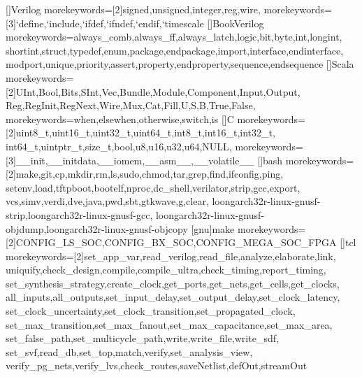 []{Verilog}{
  morekeywords=[2]{signed,unsigned,integer,reg,wire},
  morekeywords=[3]{`define,`include,`ifdef,`ifndef,`endif,`timescale}
}
[]{BookVerilog}{
  morekeywords={always_comb,always_ff,always_latch,logic,bit,byte,int,longint,
    shortint,struct,typedef,enum,package,endpackage,import,interface,endinterface,
    modport,unique,priority,assert,property,endproperty,sequence,endsequence}
}
[]{Scala}{
  morekeywords=[2]{UInt,Bool,Bits,SInt,Vec,Bundle,Module,Component,Input,Output,
    Reg,RegInit,RegNext,Wire,Mux,Cat,Fill,U,S,B,True,False},
  morekeywords={when,elsewhen,otherwise,switch,is}
}
[]{C}{
  morekeywords=[2]{uint8_t,uint16_t,uint32_t,uint64_t,int8_t,int16_t,int32_t,
    int64_t,uintptr_t,size_t,bool,u8,u16,u32,u64,NULL},
  morekeywords=[3]{__init,__initdata,__iomem,__asm__,__volatile__}
}
[]{bash}{
  morekeywords=[2]{make,git,cp,mkdir,rm,ls,sudo,chmod,tar,grep,find,ifconfig,ping,
    setenv,load,tftpboot,bootelf,nproc,dc_shell,verilator,strip,gcc,export,
    vcs,simv,verdi,dve,java,pwd,sbt,gtkwave,g,clear,
    loongarch32r-linux-gnusf-strip,loongarch32r-linux-gnusf-gcc,
    loongarch32r-linux-gnusf-objdump,loongarch32r-linux-gnusf-objcopy}
}
[gnu]{make}{
  morekeywords=[2]{CONFIG_LS_SOC,CONFIG_BX_SOC,CONFIG_MEGA_SOC_FPGA}
}
[]{tcl}{
  morekeywords=[2]{set_app_var,read_verilog,read_file,analyze,elaborate,link,
    uniquify,check_design,compile,compile_ultra,check_timing,report_timing,
    set_synthesis_strategy,create_clock,get_ports,get_nets,get_cells,get_clocks,
    all_inputs,all_outputs,set_input_delay,set_output_delay,set_clock_latency,
    set_clock_uncertainty,set_clock_transition,set_propagated_clock,
    set_max_transition,set_max_fanout,set_max_capacitance,set_max_area,
    set_false_path,set_multicycle_path,write,write_file,write_sdf,
    set_svf,read_db,set_top,match,verify,set_analysis_view,
    verify_pg_nets,verify_lvs,check_routes,saveNetlist,defOut,streamOut}
}
